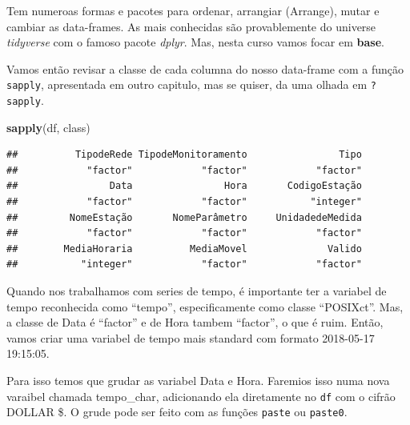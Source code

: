 \documentclass[]{book}
\newenvironment{Shaded}{\begin{snugshade}}{\end{snugshade}}
\newcommand{\KeywordTok}[1]{\textcolor[rgb]{0.13,0.29,0.53}{\textbf{#1}}}
\newcommand{\StringTok}[1]{\textcolor[rgb]{0.31,0.60,0.02}{#1}}
\newcommand{\OperatorTok}[1]{\textcolor[rgb]{0.81,0.36,0.00}{\textbf{#1}}}
\newcommand{\NormalTok}[1]{#1}
\begin{document}
Tem numeroas formas e pacotes para ordenar, arrangiar (Arrange), mutar e
cambiar as data-frames. As mais conhecidas são provablemente do universe
\emph{tidyverse} com o famoso pacote \emph{dplyr}. Mas, nesta curso
vamos focar em \textbf{base}.

Vamos então revisar a classe de cada columna do nosso data-frame com a
função \texttt{sapply}, apresentada em outro capitulo, mas se quiser, da
uma olhada em \texttt{?sapply}.

\begin{Shaded}
\begin{Highlighting}[]
\KeywordTok{sapply}\NormalTok{(df, class)}
\end{Highlighting}
\end{Shaded}

\begin{verbatim}
##          TipodeRede TipodeMonitoramento                Tipo 
##            "factor"            "factor"            "factor" 
##                Data                Hora       CodigoEstação 
##            "factor"            "factor"           "integer" 
##         NomeEstação       NomeParâmetro     UnidadedeMedida 
##            "factor"            "factor"            "factor" 
##        MediaHoraria          MediaMovel              Valido 
##           "integer"            "factor"            "factor"
\end{verbatim}

Quando nos trabalhamos com series de tempo, é importante ter a variabel
de tempo reconhecida como ``tempo'', especificamente como classe
``POSIXct''. Mas, a classe de Data é ``factor'' e de Hora tambem
``factor'', o que é ruim. Então, vamos criar uma variabel de tempo mais
standard com formato 2018-05-17 19:15:05.

Para isso temos que grudar as variabel Data e Hora. Faremios isso numa
nova varaibel chamada tempo\_char, adicionando ela diretamente no
\texttt{df} com o cifrão DOLLAR \$. O grude pode ser feito com as
funções \texttt{paste} ou \texttt{paste0}.

\begin{Shaded}
\end{Shaded}
\end{document}
